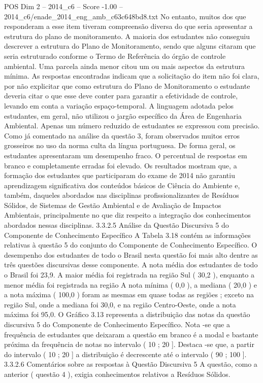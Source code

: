 \begin{textsample}{POS Dim 2 – 2014\_c6 – Score -1.00 – 2014\_c6/enade\_2014\_eng\_amb\_c63c648bd8.txt}
No entanto, muitos dos que responderam a esse item tiveram compreensão diversa do que seria apresentar a estrutura do plano de monitoramento.
A maioria dos estudantes não conseguiu descrever a estrutura do Plano de Monitoramento, sendo que alguns citaram que seria estruturado conforme o Termo de Referência do órgão de controle ambiental.
Uma parcela ainda menor citou um ou mais aspectos da estrutura mínima.
As respostas encontradas indicam que a solicitação do item não foi clara, por não explicitar que como estrutura do Plano de Monitoramento o estudante deveria citar o que esse deve conter para garantir a efetividade de controle, levando em conta a variação espaço-temporal.
A linguagem adotada pelos estudantes, em geral, não utilizou o jargão específico da Área de Engenharia Ambiental.
Apenas um número reduzido de estudantes se expressou com precisão.
Como já comentado na análise da questão 3, foram observados muitos erros grosseiros no uso da norma culta da língua portuguesa.
De forma geral, os estudantes apresentaram um desempenho fraco.
O percentual de respostas em branco e completamente erradas foi elevado.
Os resultados mostram que, a formação dos estudantes que participaram do exame de 2014 não garantiu aprendizagem significativa dos conteúdos básicos de Ciência do Ambiente e, também, daqueles abordados nas disciplinas profissionalizantes de Resíduos Sólidos, de Sistemas de Gestão Ambiental e de Avaliação de Impactos Ambientais, principalmente no que diz respeito a integração dos conhecimentos abordados nessas disciplinas. 3.3.2.5 Análise da Questão Discursiva 5 do Componente de Conhecimento Específico A Tabela 3.18 contém as informações relativas à questão 5 do conjunto do Componente de Conhecimento Específico.
O desempenho dos estudantes de todo o Brasil nesta questão foi mais alto dentre as três questões discursivas desse componente.
A nota média dos estudantes de todo o Brasil foi 23,9.
A maior média foi registrada na região Sul ( 30,2 ), enquanto a menor média foi registrada na região A nota mínima ( 0,0 ), a mediana ( 20,0 ) e a nota máxima ( 100,0 ) foram as mesmas em quase todas as regiões ; exceto na região Sul, onde a mediana foi 30,0, e na região Centro-Oeste, onde a nota máxima foi 95,0.
O Gráfico 3.13 representa a distribuição das notas da questão discursiva 5 do Componente de Conhecimento Específico.
Nota -se que a frequência de estudantes que deixaram a questão em branco é a modal e bastante próxima da frequência de notas no intervalo ( 10 ; 20 ].
Destaca -se que, a partir do intervalo ( 10 ; 20 ] a distribuição é decrescente até o intervalo ( 90 ; 100 ]. 3.3.2.6 Comentários sobre as respostas à Questão Discursiva 5 A questão, como a anterior ( questão 4 ), exigia conhecimentos relativos a Resíduos Sólidos.

\end{textsample}
